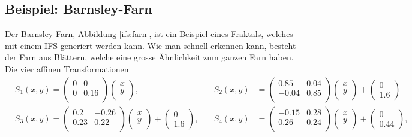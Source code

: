 \subsection{Beispiel: Barnsley-Farn}
Der Barnsley-Farn, Abbildung \ref{ifs:farn}, ist ein Beispiel eines Fraktals, welches mit einem IFS generiert werden kann.
Wie man schnell erkennen kann, besteht der Farn aus Blättern, welche eine grosse Ähnlichkeit zum ganzen Farn haben.
Die vier affinen Transformationen
\begin{align}
	& {S_1(x,y)}
	= 
	\begin{pmatrix}
		0 & 0 \\
		0 & 0.16 \\
	\end{pmatrix}
	\begin{pmatrix}
		x\\
		y\\
	\end{pmatrix}, \quad &
	{S_2(x,y)}
	&= 
	\begin{pmatrix}
		0.85 & 0.04 \\
		-0.04 & 0.85 \\
	\end{pmatrix}
	\begin{pmatrix}
		x\\
		y\\
	\end{pmatrix} 
	+
	\begin{pmatrix}
		0 \\
		1.6
	\end{pmatrix}\\
	& {S_3(x,y)}
	= 
	\begin{pmatrix}
		0.2 & -0.26 \\
		0.23 & 0.22 \\
	\end{pmatrix}
	\begin{pmatrix}
		x\\
		y\\
	\end{pmatrix} 
	+
	\begin{pmatrix}
		0 \\
		1.6
	\end{pmatrix}, \quad &
	{S_4(x,y)}
	&= 
	\begin{pmatrix}
		-0.15 & 0.28 \\
		0.26 & 0.24 \\
	\end{pmatrix}
	\begin{pmatrix}
		x\\
		y\\
	\end{pmatrix} 
	+
	\begin{pmatrix}
		0 \\
		0.44
	\end{pmatrix},\\
	\label{ifs:farnFormel}
\end{align}
